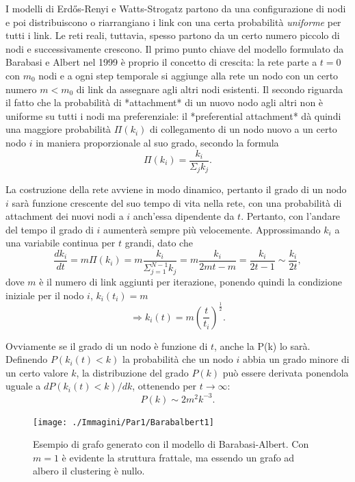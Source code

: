 I modelli di Erdős-Renyi e Watts-Strogatz partono da una configurazione di nodi e poi distribuiscono o riarrangiano i link con una certa probabilità \emph{uniforme} per tutti i link. Le reti reali, tuttavia, spesso partono da un certo numero piccolo di nodi e successivamente crescono. Il primo punto chiave del modello formulato da Barabasi e Albert nel 1999
è proprio il concetto di crescita: la rete parte a $t=0$ con $m_0$ nodi e a ogni step temporale si aggiunge alla rete un nodo con un certo numero $m < m_0$ di link da assegnare agli altri nodi esistenti. Il secondo riguarda il fatto che la probabilità di *attachment* di un nuovo nodo agli altri non è uniforme su tutti i nodi ma preferenziale: il *preferential attachment* dà quindi una maggiore probabilità $\Pi (k_i)$ di collegamento di un nodo nuovo a un certo nodo $i$ in maniera proporzionale al suo grado, secondo la formula
\[\Pi (k_i) = \frac{k_i}{\Sigma_j k_j}.\]

La costruzione della rete avviene in modo dinamico, pertanto il grado di un nodo $i$ sarà funzione crescente del suo tempo di vita nella rete, con una probabilità di attachment dei nuovi nodi a $i$ anch'essa dipendente da $t$. Pertanto, con l'andare del tempo il grado di $i$ aumenterà sempre più velocemente. Approssimando $k_i$ a una variabile continua per $t$ grandi, dato che 
\[\frac{dk_i}{dt} = m \Pi (k_i) = m \frac{k_i}{\Sigma_{j=1}^{N-1} k_j} = m \frac{k_i}{2mt - m} = \frac{k_i}{2t - 1} \sim \frac{k_i}{2t},\]
dove $m$ è il numero di link aggiunti per iterazione, ponendo quindi la condizione iniziale per il nodo $i$, $k_i(t_i) = m$
\[ \Rightarrow k_i(t) = m (\frac{t}{t_i})^\frac{1}{2}. \]

Ovviamente se il grado di un nodo è funzione di $t$, anche la P(k) lo sarà. Definendo $P(k_i(t)<k)$ la probabilità che un nodo $i$ abbia un grado minore di un certo valore $k$, la distribuzione del grado $P(k)$ può essere derivata ponendola uguale a $dP(k_i(t)<k)/dk$, ottenendo per $t\rightarrow \infty$:
\[ P(k)\sim 2m^2 k^{-3}. \]

\begin{figure}[t!]
	\centering
	\texttt{[image: ./Immagini/Par1/Barabalbert1]}
	\caption{Esempio di grafo generato con il modello di Barabasi-Albert. Con $m=1$ \`e evidente la struttura frattale, ma essendo un grafo ad albero il clustering \`e nullo.}
	\label{fig:barabalbero}
\end{figure}

